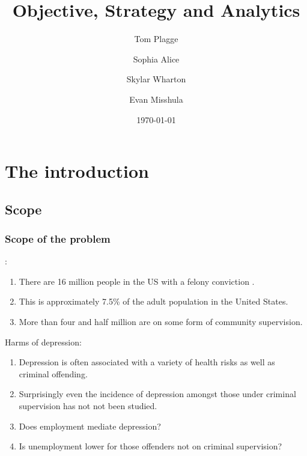 \documentclass{beamer}
\title[The Cook County Landbank]{Objective, Strategy and Analytics}
\author{Tom Plagge \and Sophia Alice \and Skylar Wharton \and Evan Misshula}
\institute{University of Chicago\\Data Science for Social Good\\\textcolor{blue}{dssg.io}}
\date{\today}
\theoremstyle{plain}
\begin{document}
\begin{frame}
\titlepage
\end{frame}


\section{The introduction}

\subsection{Scope}

\begin{frame}
\frametitle{Scope of the problem}
:
\begin{enumerate}
\pause \item There are 16 million people in the US with a felony conviction  \parencite{Uggen2006}.
\pause \item This is approximately 7.5\% of the adult population in the United States.  
\pause \item More than four and half million are on some form of community supervision.  
\end{enumerate}
\pause
Harms of depression:
\begin{enumerate}
\pause \item Depression is often associated with a variety of health risks as well as criminal offending.  
\pause \item Surprisingly even the incidence of depression amongst those under criminal supervision has not not been studied. 
\pause \item Does employment mediate depression?
\pause \item Is unemployment lower for those offenders not on criminal supervision?
\end{enumerate}
\end{frame}
\end{document}
